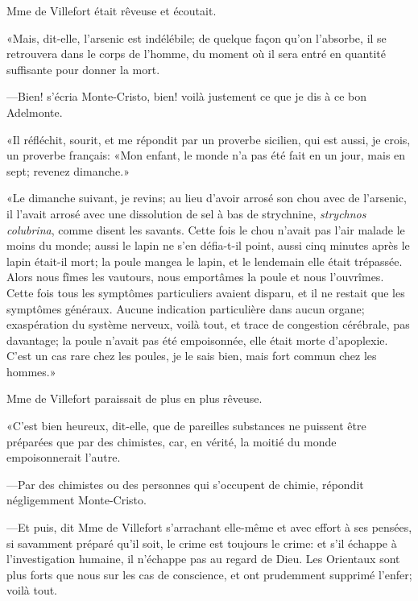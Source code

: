 Mme de Villefort était rêveuse et écoutait. 

«Mais, dit-elle, l'arsenic est indélébile; de quelque façon qu'on l'absorbe, il se retrouvera dans le corps de l'homme, du moment où il sera entré en quantité suffisante pour donner la mort. 

—Bien! s'écria Monte-Cristo, bien! voilà justement ce que je dis à ce bon Adelmonte. 

«Il réfléchit, sourit, et me répondit par un proverbe sicilien, qui est aussi, je crois, un proverbe français: «Mon enfant, le monde n'a pas été fait en un jour, mais en sept; revenez dimanche.» 

«Le dimanche suivant, je revins; au lieu d'avoir arrosé son chou avec de l'arsenic, il l'avait arrosé avec une dissolution de sel à bas de strychnine, \textit{strychnos colubrina}, comme disent les savants. Cette fois le chou n'avait pas l'air malade le moins du monde; aussi le lapin ne s'en défia-t-il point, aussi cinq minutes après le lapin était-il mort; la poule mangea le lapin, et le lendemain elle était trépassée. Alors nous fîmes les vautours, nous emportâmes la poule et nous l'ouvrîmes. Cette fois tous les symptômes particuliers avaient disparu, et il ne restait que les symptômes généraux. Aucune indication particulière dans aucun organe; exaspération du système nerveux, voilà tout, et trace de congestion cérébrale, pas davantage; la poule n'avait pas été empoisonnée, elle était morte d'apoplexie. C'est un cas rare chez les poules, je le sais bien, mais fort commun chez les hommes.» 

Mme de Villefort paraissait de plus en plus rêveuse. 

«C'est bien heureux, dit-elle, que de pareilles substances ne puissent être préparées que par des chimistes, car, en vérité, la moitié du monde empoisonnerait l'autre. 

—Par des chimistes ou des personnes qui s'occupent de chimie, répondit négligemment Monte-Cristo. 

—Et puis, dit Mme de Villefort s'arrachant elle-même et avec effort à ses pensées, si savamment préparé qu'il soit, le crime est toujours le crime: et s'il échappe à l'investigation humaine, il n'échappe pas au regard de Dieu. Les Orientaux sont plus forts que nous sur les cas de conscience, et ont prudemment supprimé l'enfer; voilà tout. 

